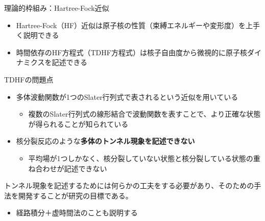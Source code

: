 \documentclass[11pt,aspectratio=169,xcolor=dvipsnames,table,dvipdfmx]{beamer}
\theoremstyle{definition}
\begin{document}
\begin{frame}{理論的枠組み：Hartree-Fock近似}
  \begin{itemize}
    \item Hartree-Fock（HF）近似は原子核の性質（束縛エネルギーや変形度）を上手く説明できる
    \item 時間依存のHF方程式（TDHF方程式）は核子自由度から微視的に原子核ダイナミクスを記述できる
  \end{itemize}
  \begin{block}{TDHFの問題点}
    \begin{itemize}
      \item 多体波動関数が1つのSlater行列式で表されるという近似を用いている
            \begin{itemize}
              \item 複数のSlater行列式の線形結合で波動関数を表すことで、より正確な状態が得られることが知られている
            \end{itemize}
      \item 核分裂反応のような\textbf{多体のトンネル現象を記述できない}
            \begin{itemize}
              \item 平均場が1つしかなく、核分裂していない状態と核分裂している状態の重ね合わせが記述できない
            \end{itemize}
    \end{itemize}
  \end{block}
  トンネル現象を記述するためには何らかの工夫をする必要があり、そのための手法を開発することが研究の目標である。
  \begin{itemize}
    \item 経路積分＋虚時間法のことも説明する
  \end{itemize}
\end{frame}
\end{document}
